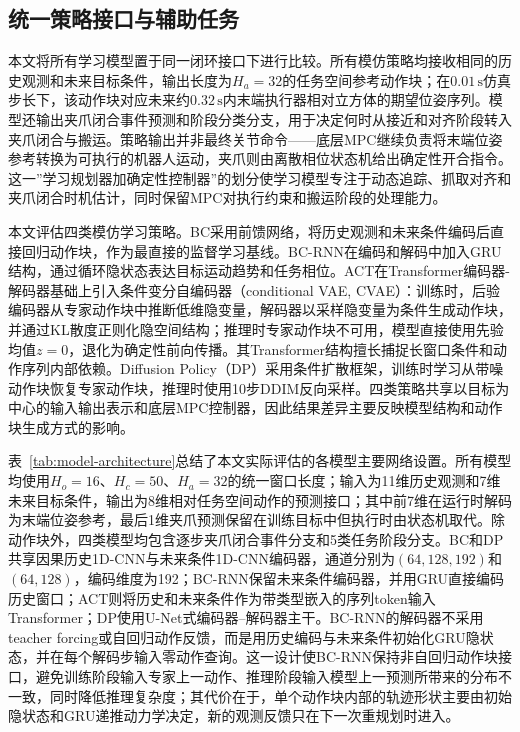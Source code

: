 \subsection{统一策略接口与辅助任务}

本文将所有学习模型置于同一闭环接口下进行比较。所有模仿策略均接收相同的历史观测和未来目标条件，输出长度为$H_a=32$的任务空间参考动作块；在$0.01\,\mathrm{s}$仿真步长下，该动作块对应未来约$0.32\,\mathrm{s}$内末端执行器相对立方体的期望位姿序列。模型还输出夹爪闭合事件预测和阶段分类分支，用于决定何时从接近和对齐阶段转入夹爪闭合与搬运。策略输出并非最终关节命令——底层MPC继续负责将末端位姿参考转换为可执行的机器人运动，夹爪则由离散相位状态机给出确定性开合指令。这一”学习规划器加确定性控制器”的划分使学习模型专注于动态追踪、抓取对齐和夹爪闭合时机估计，同时保留MPC对执行约束和搬运阶段的处理能力。

本文评估四类模仿学习策略。BC采用前馈网络，将历史观测和未来条件编码后直接回归动作块，作为最直接的监督学习基线。BC-RNN在编码和解码中加入GRU结构，通过循环隐状态表达目标运动趋势和任务相位\citep{cho2014learning,chung2014empirical,mandlekar2021matters}。ACT在Transformer编码器-解码器基础上引入条件变分自编码器（conditional VAE, CVAE）\citep{kingma2014autoencoding,sohn2015learning}：训练时，后验编码器从专家动作块中推断低维隐变量，解码器以采样隐变量为条件生成动作块，并通过KL散度正则化隐空间结构；推理时专家动作块不可用，模型直接使用先验均值$z=0$，退化为确定性前向传播。其Transformer结构擅长捕捉长窗口条件和动作序列内部依赖\citep{vaswani2017attention,zhao2023learning}。Diffusion Policy（DP）采用条件扩散框架，训练时学习从带噪动作块恢复专家动作块，推理时使用10步DDIM反向采样\citep{ho2020denoising,song2021denoising,chi2023diffusion}。四类策略共享以目标为中心的输入输出表示和底层MPC控制器，因此结果差异主要反映模型结构和动作块生成方式的影响。

表~\ref{tab:model-architecture}总结了本文实际评估的各模型主要网络设置。所有模型均使用$H_o=16$、$H_c=50$、$H_a=32$的统一窗口长度；输入为11维历史观测和7维未来目标条件，输出为8维相对任务空间动作的预测接口；其中前7维在运行时解码为末端位姿参考，最后1维夹爪预测保留在训练目标中但执行时由状态机取代。除动作块外，四类模型均包含逐步夹爪闭合事件分支和5类任务阶段分支。BC和DP共享因果历史1D-CNN与未来条件1D-CNN编码器，通道分别为$(64,128,192)$和$(64,128)$，编码维度为192；BC-RNN保留未来条件编码器，并用GRU直接编码历史窗口；ACT则将历史和未来条件作为带类型嵌入的序列token输入Transformer；DP使用U-Net式编码器--解码器主干\citep{ronneberger2015unet}。BC-RNN的解码器不采用teacher forcing或自回归动作反馈，而是用历史编码与未来条件初始化GRU隐状态，并在每个解码步输入零动作查询。这一设计使BC-RNN保持非自回归动作块接口，避免训练阶段输入专家上一动作、推理阶段输入模型上一预测所带来的分布不一致，同时降低推理复杂度；其代价在于，单个动作块内部的轨迹形状主要由初始隐状态和GRU递推动力学决定，新的观测反馈只在下一次重规划时进入。


